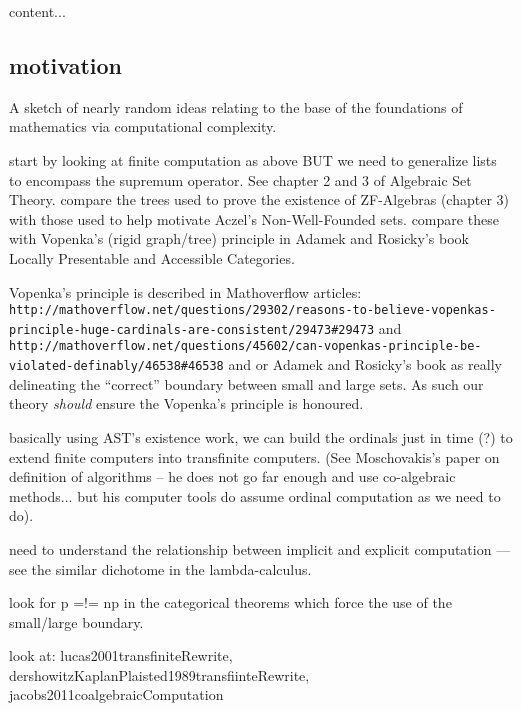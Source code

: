 \documentclass[a4paper,openany]{amsbook}
\begin{document}
\begin{definition}
content...
\end{definition}

\subsection{motivation}

A sketch of nearly random ideas relating to the base of the foundations of
mathematics via computational complexity.

start by looking at finite computation as above BUT we need to generalize lists
to encompass the supremum operator. See chapter 2 and 3 of Algebraic Set Theory.
compare the trees used to prove the existence of ZF-Algebras (chapter 3) with
those used to help motivate Aczel's Non-Well-Founded sets. compare these with
Vopenka's (rigid graph/tree) principle in Adamek and Rosicky's book Locally
Presentable and Accessible Categories.

Vopenka's principle is described in Mathoverflow articles:
\verb|http://mathoverflow.net/questions/29302/reasons-to-believe-vopenkas-principle-huge-cardinals-are-consistent/29473#29473|
and
\verb|http://mathoverflow.net/questions/45602/can-vopenkas-principle-be-violated-definably/46538#46538|
and or Adamek and Rosicky's book as really delineating the ``correct'' boundary
between small and large sets. As such our theory \emph{should} ensure the
Vopenka's principle is honoured.

basically using AST's existence work, we can build the ordinals just in time (?)
to extend finite computers into transfinite computers. (See Moschovakis's paper
on definition of algorithms -- he does not go far enough and use co-algebraic
methods... but his computer tools do assume ordinal computation as we need to
do).

need to understand the relationship between implicit and explicit computation
--- see the similar dichotome in the lambda-calculus.

look for p =!= np in the categorical theorems which force the use of the
small/large boundary.

look at: lucas2001transfiniteRewrite,
dershowitzKaplanPlaisted1989transfiinteRewrite,
jacobs2011coalgebraicComputation



\end{document}
